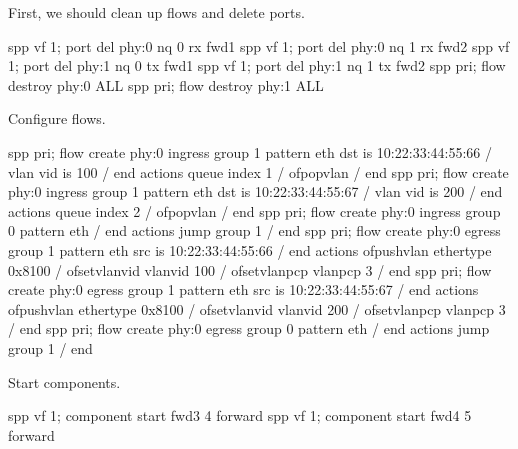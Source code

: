 \documentclass[a4paper,11pt,openany,oneside,english]{sphinxmanual}
\begin{document}
\begin{figure}[htbp]
\centering

\noindent{}
\end{figure}

First, we should clean up flows and delete ports.

\begin{sphinxVerbatim}[commandchars=\\\{\},formatcom=\footnotesize]
spp \PYGZgt{} vf 1; port del phy:0 nq 0 rx fwd1
spp \PYGZgt{} vf 1; port del phy:0 nq 1 rx fwd2
spp \PYGZgt{} vf 1; port del phy:1 nq 0 tx fwd1
spp \PYGZgt{} vf 1; port del phy:1 nq 1 tx fwd2
spp \PYGZgt{} pri; flow destroy phy:0 ALL
spp \PYGZgt{} pri; flow destroy phy:1 ALL
\end{sphinxVerbatim}

Configure flows.

\begin{sphinxVerbatim}[commandchars=\\\{\},formatcom=\footnotesize]
spp \PYGZgt{} pri; flow create phy:0 ingress group 1 pattern eth dst is \PYGZbs{}
10:22:33:44:55:66 / vlan vid is 100 / end actions queue index 1 \PYGZbs{}
/ of\PYGZus{}pop\PYGZus{}vlan / end
spp \PYGZgt{} pri; flow create phy:0 ingress group 1 pattern eth dst is \PYGZbs{}
10:22:33:44:55:67 / vlan vid is 200 / end actions queue index 2 \PYGZbs{}
/ of\PYGZus{}pop\PYGZus{}vlan / end
spp \PYGZgt{} pri; flow create phy:0 ingress group 0 pattern eth / end \PYGZbs{}
actions jump group 1 / end
spp \PYGZgt{} pri; flow create phy:0 egress group 1 pattern eth src is \PYGZbs{}
10:22:33:44:55:66 / end actions of\PYGZus{}push\PYGZus{}vlan ethertype 0x8100 \PYGZbs{}
/ of\PYGZus{}set\PYGZus{}vlan\PYGZus{}vid vlan\PYGZus{}vid 100 / of\PYGZus{}set\PYGZus{}vlan\PYGZus{}pcp vlan\PYGZus{}pcp 3 / end
spp \PYGZgt{} pri; flow create phy:0 egress group 1 pattern eth src is \PYGZbs{}
10:22:33:44:55:67 / end actions of\PYGZus{}push\PYGZus{}vlan ethertype 0x8100 \PYGZbs{}
/ of\PYGZus{}set\PYGZus{}vlan\PYGZus{}vid vlan\PYGZus{}vid 200 / of\PYGZus{}set\PYGZus{}vlan\PYGZus{}pcp vlan\PYGZus{}pcp 3 / end
spp \PYGZgt{} pri; flow create phy:0 egress group 0 pattern eth / end \PYGZbs{}
actions jump group 1 / end
\end{sphinxVerbatim}

Start components.

\begin{sphinxVerbatim}[commandchars=\\\{\},formatcom=\footnotesize]
spp \PYGZgt{} vf 1; component start fwd3 4 forward
spp \PYGZgt{} vf 1; component start fwd4 5 forward
\end{sphinxVerbatim}
\end{document}
